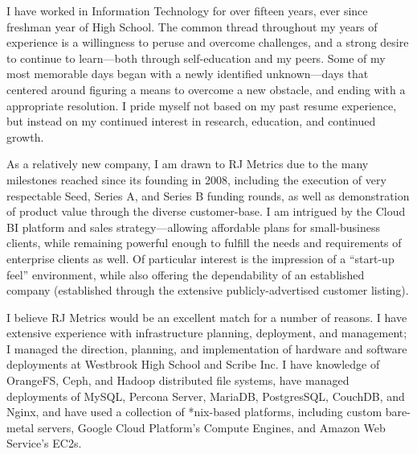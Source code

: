 %
%
%
%

\makelettertitle


\begin{cvletter}

I have worked in Information Technology for over fifteen years, ever since freshman year of High School. The common thread
throughout my years of experience is a willingness to peruse and overcome challenges, and a strong desire to continue
to learn---both through self-education and my peers. Some of my most memorable days began with a newly identified
unknown---days that centered around figuring a means to overcome a new obstacle, and ending with a appropriate resolution.
I pride myself not based on my past resume experience, but instead on my continued interest in research, education, and
continued growth.

As a relatively new company, I am drawn to RJ Metrics due to the many milestones reached since its founding in 2008,
including the execution of very respectable Seed, Series A, and Series B funding rounds, as well as demonstration of
product value through the diverse customer-base. I am intrigued by the Cloud BI platform and sales strategy---allowing
affordable plans for small-business clients, while remaining powerful enough to fulfill the needs and requirements of
enterprise clients as well. Of particular interest is the impression of a ``start-up feel'' environment, while also
offering the dependability of an established company (established through the extensive publicly-advertised customer
listing).

I believe RJ Metrics would be an excellent match for a number of reasons. I have extensive experience with infrastructure
planning, deployment, and management; I managed the direction, planning, and implementation of hardware and software
deployments at Westbrook High School and Scribe Inc. I have knowledge of OrangeFS, Ceph, and Hadoop distributed file
systems, have managed deployments of MySQL, Percona Server, MariaDB, PostgresSQL, CouchDB, and Nginx, and have used a
collection of *nix-based platforms, including custom bare-metal servers, Google Cloud Platform's Compute Engines, and
Amazon Web Service's EC2s.


\end{cvletter}
